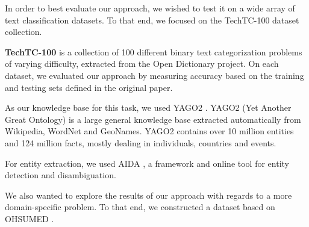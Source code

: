 \documentclass{article}
\theoremstyle{definition}
\begin{document}

In order to best evaluate our approach, we wished to test it on a wide array of text classification datasets. To that end, we focused on the TechTC-100 \citep{gabrilovich2004text} dataset collection.

\textbf{TechTC-100} is a collection of 100 different binary text categorization problems of varying difficulty, extracted from the Open Dictionary project.
On each dataset, we evaluated our approach  by measuring accuracy based on the training and testing sets defined in the original paper. 

As our knowledge base for this task, we used YAGO2 \citep{hoffart2013yago2}.
YAGO2 (Yet Another Great Ontology) is a large general knowledge base extracted automatically from Wikipedia, WordNet and GeoNames.
YAGO2 contains over 10 million entities and 124 million facts, mostly dealing in individuals, countries and events.

For entity extraction, we used AIDA \citep{hoffart2011robust}, a framework and online tool for entity detection and disambiguation. %


We also wanted to explore the results of our approach with regards to a more domain-specific problem.
To that end, we constructed a dataset based on OHSUMED \citep{hersh1994ohsumed}.
\end{document}
